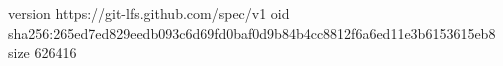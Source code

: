 version https://git-lfs.github.com/spec/v1
oid sha256:265ed7ed829eedb093c6d69fd0baf0d9b84b4cc8812f6a6ed11e3b6153615eb8
size 626416
